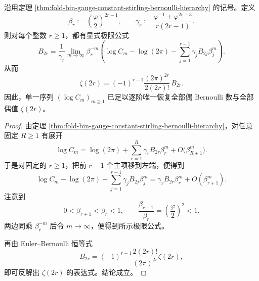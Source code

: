 \begin{theorem}\label{thm:xi-time-part60acb-gauge-constant-recovers-even-zeta}
沿用定理 \ref{thm:fold-bin-gauge-constant-stirling-bernoulli-hierarchy} 的记号。定义
\[
\beta_r:=\left(\frac{\varphi}{2}\right)^{2r-1},
\qquad
\gamma_r:=\frac{\varphi^{-1}+\varphi^{2r-3}}{r(2r-1)}.
\]
则对每个整数 \(r\ge 1\)，都有显式极限公式
\[
B_{2r}
=
\frac{1}{\gamma_r}
\lim_{m\to\infty}
\beta_r^{-m}
\left(
\log C_m-\log(2\pi)-\sum_{j=1}^{r-1}\gamma_j B_{2j}\beta_j^m
\right).
\]
从而
\[
\zeta(2r)
=
(-1)^{r-1}\frac{(2\pi)^{2r}}{2(2r)!}\,B_{2r}.
\]
因此，单一序列 \((\log C_m)_{m\ge 1}\) 已足以逐阶唯一恢复全部偶 Bernoulli 数与全部偶值 \(\zeta(2r)\)。
\end{theorem}
\begin{proof}
由定理 \ref{thm:fold-bin-gauge-constant-stirling-bernoulli-hierarchy}，对任意固定 \(R\ge 1\) 有展开
\[
\log C_m
=
\log(2\pi)+
\sum_{r=1}^{R}
\gamma_r B_{2r}\beta_r^m
+
O\!\bigl(\beta_{R+1}^m\bigr).
\]
于是对固定的 \(r\ge 1\)，把前 \(r-1\) 个主项移到左端，便得到
\[
\log C_m-\log(2\pi)-\sum_{j=1}^{r-1}\gamma_j B_{2j}\beta_j^m
=
\gamma_r B_{2r}\beta_r^m+O(\beta_{r+1}^m).
\]
注意到
\[
0<\beta_{r+1}<\beta_r<1,
\qquad
\frac{\beta_{r+1}}{\beta_r}
=
\left(\frac{\varphi}{2}\right)^2<1.
\]
两边同乘 \(\beta_r^{-m}\) 后令 \(m\to\infty\)，便得到所示极限公式。

再由 Euler--Bernoulli 恒等式
\[
B_{2r}
=
(-1)^{r-1}\frac{2(2r)!}{(2\pi)^{2r}}\zeta(2r),
\]
即可反解出 \(\zeta(2r)\) 的表达式。结论成立。
\end{proof}

